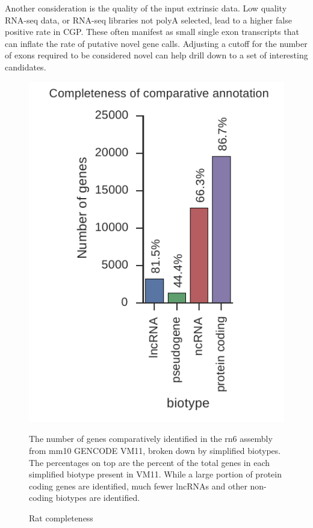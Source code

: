 \documentclass[fleqn,10pt]{wlscirep}
\begin{document}
Another consideration is the quality of the input extrinsic data. Low quality RNA-seq data, or RNA-seq libraries not polyA selected, lead to a higher false positive rate in CGP. These often manifest as small single exon transcripts that can inflate the rate of putative novel gene calls. Adjusting a cutoff for the number of exons required to be considered novel can help drill down to a set of interesting candidates.

\clearpage

\begin{figure}
\centering
\includegraphics[]{rat_completeness.pdf}
\caption{Rat completeness}
The number of genes comparatively identified in the rn6 assembly from mm10 GENCODE VM11, broken down by simplified biotypes. The percentages on top are the percent of the total genes in each simplified biotype present in VM11. While a large portion of protein coding genes are identified, much fewer lncRNAs and other non-coding biotypes are identified.
\label{supp_fig:rat_completeness}
\end{figure}
\end{document}
